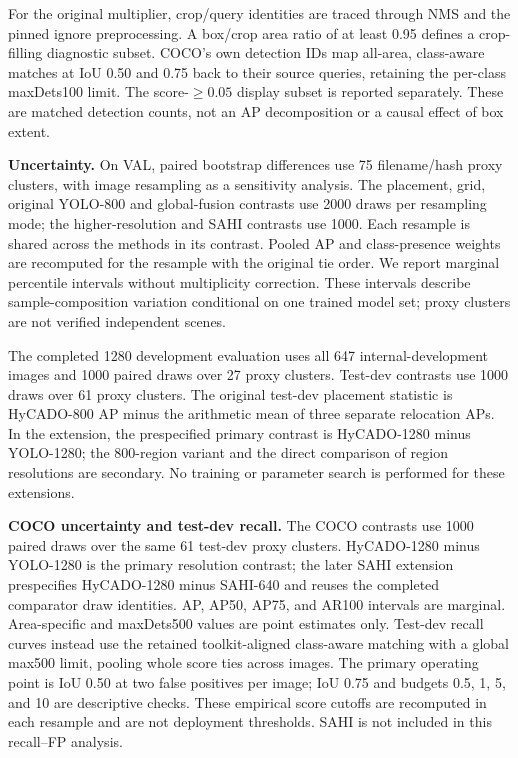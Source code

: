 \documentclass[journal]{IEEEtran}
\begin{document}
For the original multiplier, crop/query identities are traced through NMS and the pinned ignore preprocessing. A box/crop area ratio of at least 0.95 defines a crop-filling diagnostic subset. COCO's own detection IDs map all-area, class-aware matches at IoU 0.50 and 0.75 back to their source queries, retaining the per-class maxDets100 limit. The score-$\geq0.05$ display subset is reported separately. These are matched detection counts, not an AP decomposition or a causal effect of box extent.

\textbf{Uncertainty.} On VAL, paired bootstrap differences use 75 filename/hash proxy clusters, with image resampling as a sensitivity analysis. The placement, grid, original YOLO-800 and global-fusion contrasts use 2000 draws per resampling mode; the higher-resolution and SAHI contrasts use 1000. Each resample is shared across the methods in its contrast. Pooled AP and class-presence weights are recomputed for the resample with the original tie order. We report marginal percentile intervals without multiplicity correction. These intervals describe sample-composition variation conditional on one trained model set; proxy clusters are not verified independent scenes.

The completed 1280 development evaluation uses all 647 internal-development images and 1000 paired draws over 27 proxy clusters. Test-dev contrasts use 1000 draws over 61 proxy clusters. The original test-dev placement statistic is HyCADO-800 AP minus the arithmetic mean of three separate relocation APs. In the extension, the prespecified primary contrast is HyCADO-1280 minus YOLO-1280; the 800-region variant and the direct comparison of region resolutions are secondary. No training or parameter search is performed for these extensions.

\textbf{COCO uncertainty and test-dev recall.} The COCO contrasts use 1000 paired draws over the same 61 test-dev proxy clusters. HyCADO-1280 minus YOLO-1280 is the primary resolution contrast; the later SAHI extension prespecifies HyCADO-1280 minus SAHI-640 and reuses the completed comparator draw identities. AP, AP50, AP75, and AR100 intervals are marginal. Area-specific and maxDets500 values are point estimates only. Test-dev recall curves instead use the retained toolkit-aligned class-aware matching with a global max500 limit, pooling whole score ties across images. The primary operating point is IoU 0.50 at two false positives per image; IoU 0.75 and budgets 0.5, 1, 5, and 10 are descriptive checks. These empirical score cutoffs are recomputed in each resample and are not deployment thresholds. SAHI is not included in this recall--FP analysis.
\end{document}
